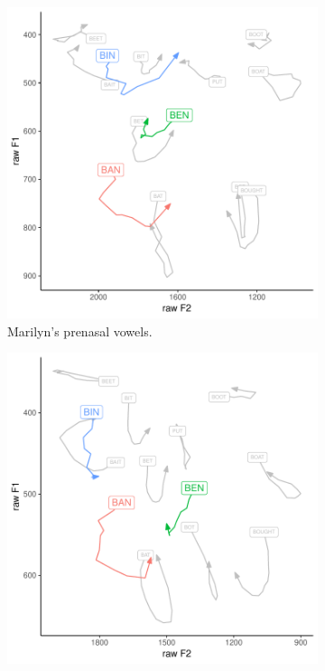 \begin{figure}[tb!]
    \centering
    \hspace{\fill}
    \begin{subfigure}[t]{2.925in}
        \centering
        \includegraphics[width = \textwidth]{Figures/example_plots/37-Marilyn_avg_prenasal.pdf}
        \caption{Marilyn's prenasal vowels.}
        \label{fig:marilyn_prenasal}
    \end{subfigure}
    \hspace{\fill}
    \begin{subfigure}[t]{2.925in}
        \centering
        \includegraphics[width = \textwidth]{Figures/example_plots/16-Earl_avg_prenasal.pdf}

\end{subfigure}
\end{figure}
